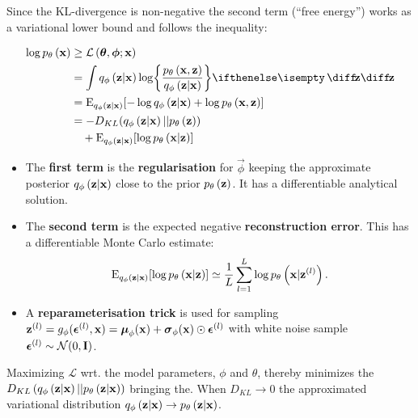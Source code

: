 Since the KL-divergence is non-negative the second term (``free energy'') works as a variational lower bound and follows the inequality:

\begin{gather}
	\begin{split}
		\log \dec{\vec{x}} & \ge \mathcal{L}\left(\vec{\theta},\vec{\phi};\vec{x}\right)
		\\ & =
		\int \enc{\vec{z}|\vec{x}} \log \curlies*{ \frac{\dec{\vec{x},\vec{z}}}{\enc{\vec{z}|\vec{x}} } } \D{\vec{z}} \\ 
		& = \E_{\enc{\vec{z}|\vec{x}}} \brackets{- \log \enc{\vec{z}|\vec{x}} + \log \dec{\vec{x},\vec{z}} } 
		\\
		& = -D_{KL}\parens{ \enc{\vec{z}|\vec{x}}||\dec{\vec{z}} } 
		\\ 
		& \quad+ \E_{\enc{\vec{z}|\vec{x}}} \brackets{\log \dec{\vec{x}|\vec{z}} }   	
	\end{split} 
\end{gather}

\begin{itemize}
		\item The \textbf{first term} is the \textbf{regularisation} for $\vec{\phi}$ keeping the approximate posterior $q_{\phi}\left(\bm{\mathrm{z}}|\bm{\mathrm{x}}\right)$ close to the prior $p_{\theta}\left(\bm{\mathrm{z}}\right)$. It has a differentiable analytical solution.
		\item The \textbf{second term} is the expected negative \textbf{reconstruction error}. This has a differentiable Monte Carlo estimate:
		\begin{equation*}
			\operatorname{E}_{q_{\phi}\left(\bm{\mathrm{z}}|\bm{\mathrm{x}}\right)} [\log p_{\theta}\left(\bm{\mathrm{x}}|\bm{\mathrm{z}}\right) ] \simeq \frac{1}{L}\sum^L_{l=1} \log p_{\theta}\left(\bm{\mathrm{x}}|\bm{\mathrm{z}}^{(l)}\right).
		\end{equation*}
		\item A \textbf{reparameterisation trick} is used for sampling $\bm{\mathrm{z}}^{(l)}= g_\phi (\bm{\mathrm{\epsilon}}^{(l)}, \bm{\mathrm{x}})= \bm{\mathrm{\mu}}_\phi(\bm{\mathrm{x}}) + \bm{\mathrm{\sigma}}_\phi(\bm{\mathrm{x}}) \odot \bm{\mathrm{\epsilon}}^{(l)}$ with white noise sample $\bm{\mathrm{\epsilon}}^{(l)} \sim \mathcal{N}(0,\bm{\mathrm{I}})$.
\end{itemize}

Maximizing $\mathcal{L}$ wrt. the model parameters, $\phi$ and $\theta$, thereby minimizes the $D_{KL}\left( q_{\phi}\left(\bm{\mathrm{z}}|\bm{\mathrm{x}}\right)||p_{\theta}\left(\bm{\mathrm{z}}|\bm{\mathrm{x}}\right)\right)$ bringing the. When $D_{KL}\rightarrow 0$ the approximated variational distribution $q_{\phi}\left(\bm{\mathrm{z}}|\bm{\mathrm{x}}\right)\rightarrow p_{\theta}\left(\bm{\mathrm{z}}|\bm{\mathrm{x}}\right)$.

